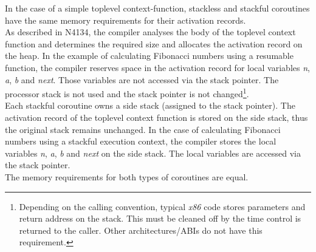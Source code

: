In the case of a simple toplevel context-function, stackless and stackful coroutines
have the same memory requirements for their activation records.\\
\newline
As described in N4134, the compiler analyses the body of the toplevel context
function and determines the required size and allocates the activation record on
the heap.
In the example of calculating Fibonacci numbers using a resumable function, the
compiler reserves space in the activation record for local variables \emph{n},
\emph{a}, \emph{b} and \emph{next}. Those variables are not accessed via the
stack pointer. The processor stack is not used and the stack pointer is not
changed\footnote{Depending on the calling convention, typical \emph{x86} code
stores parameters and return address on the stack. This must be cleaned off by
the time control is returned to the caller. Other architectures/ABIs do
not have this requirement.}.\\
\newline
Each stackful coroutine owns a side stack (assigned to the stack pointer). The
activation record of the toplevel context function is stored on the side
stack, thus the original stack remains unchanged.
In the case of calculating Fibonacci numbers using a stackful execution
context, the compiler stores the local variables \emph{n}, \emph{a},
\emph{b} and \emph{next} on the side stack. The local variables are accessed
via the stack pointer.\\
\newline
The memory requirements for both types of coroutines are equal.

